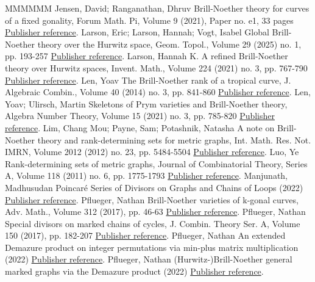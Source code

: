 \documentclass[11pt]{article}
\theoremstyle{definition}
\numberwithin{equation}{section}
\begin{document}
\begin{thebibliography}{MMMMMM}
 Jensen, David; Ranganathan, Dhruv Brill-Noether theory for curves of a fixed gonality, Forum Math. Pi, Volume 9 (2021), Paper no. e1, 33 pages \href{https://alco.centre-mersenne.org/articles/10.5802/alco.443/#JensenRanganathan}{Publisher reference}.
 Larson, Eric; Larson, Hannah; Vogt, Isabel Global Brill-Noether theory over the Hurwitz space, Geom. Topol., Volume 29 (2025) no. 1, pp. 193-257 \href{https://alco.centre-mersenne.org/articles/10.5802/alco.443/#larsonLarsonVogt}{Publisher reference}.
 Larson, Hannah K. A refined Brill-Noether theory over Hurwitz spaces, Invent. Math., Volume 224 (2021) no. 3, pp. 767-790 \href{https://alco.centre-mersenne.org/articles/10.5802/alco.443/#larsonHBN}{Publisher reference}.
 Len, Yoav The Brill-Noether rank of a tropical curve, J. Algebraic Combin., Volume 40 (2014) no. 3, pp. 841-860 \href{https://alco.centre-mersenne.org/articles/10.5802/alco.443/#len14}{Publisher reference}.
 Len, Yoav; Ulirsch, Martin Skeletons of Prym varieties and Brill-Noether theory, Algebra Number Theory, Volume 15 (2021) no. 3, pp. 785-820 \href{https://alco.centre-mersenne.org/articles/10.5802/alco.443/#LenUlirsch}{Publisher reference}.
 Lim, Chang Mou; Payne, Sam; Potashnik, Natasha A note on Brill-Noether theory and rank-determining sets for metric graphs, Int. Math. Res. Not. IMRN, Volume 2012 (2012) no. 23, pp. 5484-5504 \href{https://alco.centre-mersenne.org/articles/10.5802/alco.443/#lpp}{Publisher reference}.
 Luo, Ye Rank-determining sets of metric graphs, Journal of Combinatorial Theory, Series A, Volume 118 (2011) no. 6, pp. 1775-1793 \href{https://alco.centre-mersenne.org/articles/10.5802/alco.443/#RDS}{Publisher reference}.
 Manjunath, Madhusudan Poincaré Series of Divisors on Graphs and Chains of Loops (2022) \href{https://alco.centre-mersenne.org/articles/10.5802/alco.443/#manjunath2020poincar}{Publisher reference}.
 Pflueger, Nathan Brill-Noether varieties of k-gonal curves, Adv. Math., Volume 312 (2017), pp. 46-63 \href{https://alco.centre-mersenne.org/articles/10.5802/alco.443/#PflKGonal}{Publisher reference}.
 Pflueger, Nathan Special divisors on marked chains of cycles, J. Combin. Theory Ser. A, Volume 150 (2017), pp. 182-207 \href{https://alco.centre-mersenne.org/articles/10.5802/alco.443/#Pfl17}{Publisher reference}.
 Pflueger, Nathan An extended Demazure product on integer permutations via min-plus matrix multiplication (2022) \href{https://alco.centre-mersenne.org/articles/10.5802/alco.443/#PflDemProd}{Publisher reference}.
 Pflueger, Nathan (Hurwitz-)Brill-Noether general marked graphs via the Demazure product (2022) \href{https://alco.centre-mersenne.org/articles/10.5802/alco.443/#Pfl22}{Publisher reference}.
\end{thebibliography}
\end{document}

